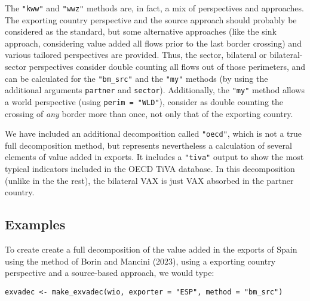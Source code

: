 The \texttt{"kww"} and \texttt{"wwz"} methods are, in fact, a mix of perspectives and
approaches. The exporting country perspective and the source approach should
probably be considered as the standard, but some alternative approaches (like
the sink approach, considering value added all flows prior to the last border
crossing) and various tailored perspectives are provided. Thus, the sector,
bilateral or bilateral-sector perspectives consider double counting all flows
out of those perimeters, and can be calculated for the \texttt{"bm\_src"} and the \texttt{"my"}
methods (by using the additional arguments \texttt{partner} and \texttt{sector}).
Additionally, the \texttt{"my"} method allows a world perspective (using \texttt{perim\ =\ "WLD"}), consider as double counting the crossing of \emph{any} border more than
once, not only that of the exporting country.

We have included an additional decomposition called \texttt{"oecd"}, which is not a
true full decomposition method, but represents nevertheless a calculation of
several elements of value added in exports. It includes a \texttt{"tiva"} output to
show the most typical indicators included in the OECD TiVA database. In this
decomposition (unlike in the the rest), the bilateral VAX is just VAX absorbed
in the partner country.

\hypertarget{examples}{%
\subsection{Examples}\label{examples}}

To create create a full decomposition of the value added in the exports of Spain
using the method of Borin and Mancini (2023), using a exporting country perspective
and a source-based approach, we would type:

\begin{verbatim}
exvadec <- make_exvadec(wio, exporter = "ESP", method = "bm_src")
\end{verbatim}

